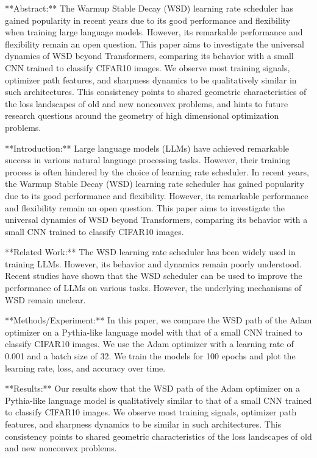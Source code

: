 **Abstract:**
The Warmup Stable Decay (WSD) learning rate scheduler has gained popularity in recent years due to its good performance and flexibility when training large language models. However, its remarkable performance and flexibility remain an open question. This paper aims to investigate the universal dynamics of WSD beyond Transformers, comparing its behavior with a small CNN trained to classify CIFAR10 images. We observe most training signals, optimizer path features, and sharpness dynamics to be qualitatively similar in such architectures. This consistency points to shared geometric characteristics of the loss landscapes of old and new nonconvex problems, and hints to future research questions around the geometry of high dimensional optimization problems.

**Introduction:**
Large language models (LLMs) have achieved remarkable success in various natural language processing tasks. However, their training process is often hindered by the choice of learning rate scheduler. In recent years, the Warmup Stable Decay (WSD) learning rate scheduler has gained popularity due to its good performance and flexibility. However, its remarkable performance and flexibility remain an open question. This paper aims to investigate the universal dynamics of WSD beyond Transformers, comparing its behavior with a small CNN trained to classify CIFAR10 images.

**Related Work:**
The WSD learning rate scheduler has been widely used in training LLMs. However, its behavior and dynamics remain poorly understood. Recent studies have shown that the WSD scheduler can be used to improve the performance of LLMs on various tasks. However, the underlying mechanisms of WSD remain unclear.

**Methods/Experiment:**
In this paper, we compare the WSD path of the Adam optimizer on a Pythia-like language model with that of a small CNN trained to classify CIFAR10 images. We use the Adam optimizer with a learning rate of 0.001 and a batch size of 32. We train the models for 100 epochs and plot the learning rate, loss, and accuracy over time.

**Results:**
Our results show that the WSD path of the Adam optimizer on a Pythia-like language model is qualitatively similar to that of a small CNN trained to classify CIFAR10 images. We observe most training signals, optimizer path features, and sharpness dynamics to be similar in such architectures. This consistency points to shared geometric characteristics of the loss landscapes of old and new nonconvex problems.

